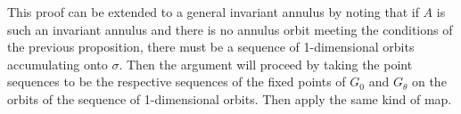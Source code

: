 \documentclass[10pt, oneside]{article}
\theoremstyle{definition}
\theoremstyle{definition}
\begin{document}
This proof can be extended to a general invariant annulus by noting that if $A$ is such an invariant annulus and there is no annulus orbit meeting the conditions of the previous proposition, there must be a sequence of 1-dimensional orbits accumulating onto $\sigma$. Then the argument will proceed by taking the point sequences to be the respective sequences of the fixed points of $G_0$ and $G_\theta$ on the orbits of the sequence of 1-dimensional orbits. Then apply the same kind of map.

\listoftodos[Notes]
\end{document}
